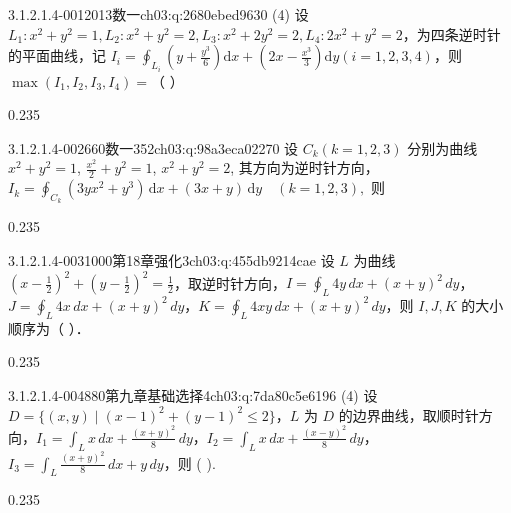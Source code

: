 \par\addvspace{2.4ex}\noindent
\begin{minipage}{\linewidth}

\begin{q}{3.1.2.1.4-001}{2013数一}{ch03:q:2680ebed9630}
(4) 设 $L_1:x^2+y^2=1,L_2:x^2+y^2=2,L_3:x^2+2y^2=2,L_4:2x^2+y^2=2$，为四条逆时针的平面曲线，记 $\displaystyle I_i=\oint_{L_i}(y+\frac{y^3}{6})\mathrm{d}x+(2x-\frac{x^3}{3})\mathrm{d}y(i=1,2,3,4)$，则 $\max(I_1,I_2,I_3,I_4)=$（  ）
\begin{opts}{0.235}
\hfill{}\hfill{}\hfill{}
\end{opts}
\end{q}
\end{minipage}


\begin{q}{3.1.2.1.4-002}{660数一352}{ch03:q:98a3eca02270}
设 $C_k(k=1,2,3)$ 分别为曲线 $x^2+y^2=1$, $\frac{x^2}{2}+y^2=1$, $x^2+y^2=2$, 其方向为逆时针方向，$\displaystyle I_k=\oint_{C_k}(3yx^2+y^3)\,\mathrm{d}x+(3x+y)\,\mathrm{d}y\quad(k=1,2,3),$ 则
\begin{opts}{0.235}
\hfill{}\hfill{}\hfill{}
\end{opts}
\end{q}

\begin{q}{3.1.2.1.4-003}{1000第18章强化3}{ch03:q:455db9214cae}
设 $L$ 为曲线 $\left(x-\frac{1}{2}\right)^2+\left(y-\frac{1}{2}\right)^2=\frac{1}{2}$，取逆时针方向，$\displaystyle I=\oint_L 4y\,dx+(x+y)^2\,dy$，$\displaystyle J=\oint_L 4x\,dx+(x+y)^2\,dy$，$\displaystyle K=\oint_L 4xy\,dx+(x+y)^2\,dy$，则 $I,J,K$ 的大小顺序为（ ）．
\begin{opts}{0.235}
\hfill{}\hfill{}\hfill{}
\end{opts}
\end{q}

\begin{q}{3.1.2.1.4-004}{880第九章基础选择4}{ch03:q:7da80c5e6196}
(4) 设 $D=\{(x,y)\mid (x-1)^2+(y-1)^2\le 2\}$，$L$ 为 $D$ 的边界曲线，取顺时针方向，$\displaystyle I_1=\int_L x\,dx+\frac{(x+y)^2}{8}\,dy$，$\displaystyle I_2=\int_L x\,dx+\frac{(x-y)^2}{8}\,dy$，$\displaystyle I_3=\int_L \frac{(x+y)^2}{8}\,dx+y\,dy$，则 ( ).
\begin{opts}{0.235}
\hfill{}\hfill{}\hfill{}
\end{opts}
\end{q}

